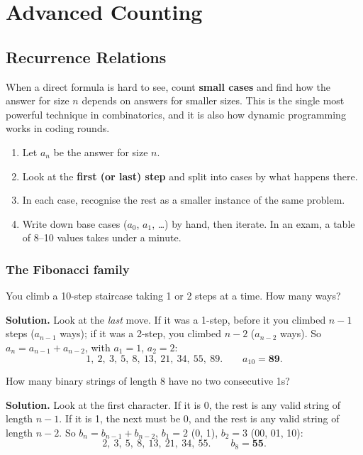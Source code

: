 \documentclass[11pt,a4paper,openany]{report}
\begin{document}
\part{Advanced Counting}
\chapter{Recurrence Relations}\label{ch:rec}

When a direct formula is hard to see, count \textbf{small cases} and find how the answer for size $n$
depends on answers for smaller sizes. This is the single most powerful technique in combinatorics,
and it is also how dynamic programming works in coding rounds.

\begin{idea}
\begin{enumerate}[nosep]
\item Let $a_n$ be the answer for size $n$.
\item Look at the \textbf{first (or last) step} and split into cases by what happens there.
\item In each case, recognise the rest as a smaller instance of the same problem.
\item Write down base cases ($a_0$, $a_1$, \dots) by hand, then iterate. In an exam, a table of 8--10 values takes under a minute.
\end{enumerate}
\end{idea}

\section{The Fibonacci family}
\begin{example}[staircase]
You climb a 10-step staircase taking 1 or 2 steps at a time. How many ways?

\textbf{Solution.} Look at the \emph{last} move. If it was a 1-step, before it you climbed $n-1$ steps
($a_{n-1}$ ways); if it was a 2-step, you climbed $n-2$ ($a_{n-2}$ ways). So $a_n=a_{n-1}+a_{n-2}$,
with $a_1=1$, $a_2=2$:
\[1,\ 2,\ 3,\ 5,\ 8,\ 13,\ 21,\ 34,\ 55,\ 89.\qquad a_{10}=\mathbf{89}.\]
\end{example}

\begin{example}
How many binary strings of length 8 have no two consecutive 1s?

\textbf{Solution.} Look at the first character. If it is 0, the rest is any valid string of length $n-1$.
If it is 1, the next must be 0, and the rest is any valid string of length $n-2$.
So $b_n=b_{n-1}+b_{n-2}$, $b_1=2$ (0, 1), $b_2=3$ (00, 01, 10):
\[2,\ 3,\ 5,\ 8,\ 13,\ 21,\ 34,\ 55.\qquad b_8=\mathbf{55}.\]
\end{example}
\end{document}
